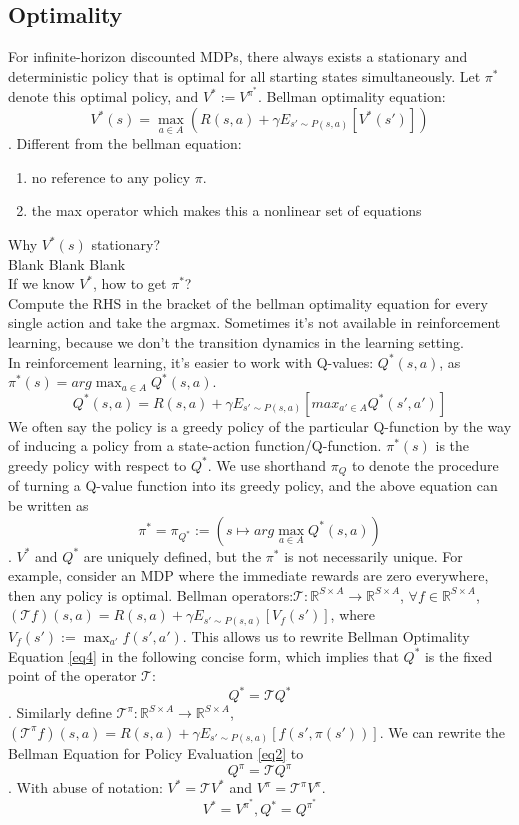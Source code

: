 \documentclass{report}
\begin{document}
\subsection{Optimality}
For infinite-horizon discounted MDPs, there always exists a 
stationary and deterministic policy that is optimal for all starting states simultaneously. Let $\pi^*$ denote this optimal policy, and $V^* := V^{\pi^*}$. Bellman optimality equation: 
\begin{equation}\label{eq3}
    V^*(s)=\max_{a\in A}(R(s,a)+\gamma E_{s'\sim P(s,a)}[V^*(s')])
\end{equation}
. Different from the bellman equation:
\begin{enumerate}
    \item no reference to any policy $\pi$.
    \item the max operator which makes this a nonlinear set of equations
\end{enumerate}
Why $V^*(s)$ stationary? \\
Blank Blank  Blank \\
If we know $V^*$, how to get $\pi^*$? \\
Compute the RHS in the bracket of the bellman optimality equation for every single action and take the argmax. Sometimes it's not available in reinforcement learning, because we don't the transition dynamics in the learning setting.\\
In reinforcement learning, it's easier to work with Q-values: $Q^*(s,a)$, as $\pi^*(s)=arg\max_{a\in A}Q^*(s,a)$. 
\begin{equation}\label{eq4}
    Q^*(s,a)=R(s,a)+\gamma E_{s'\sim P(s,a)}[max_{a'\in A}Q^*(s',a')]
\end{equation}
We often say the policy is a greedy policy of the particular Q-function by the way of inducing a policy from a state-action function/Q-function. $\pi^*(s)$ is the greedy policy with respect to $Q^*$. We use shorthand $\pi_Q$ to denote the procedure of turning a Q-value function into its greedy policy, and the above equation can be written as \[\pi^*=\pi_{Q^*}:=(s \mapsto arg\max_{a\in A}Q^*(s,a))\].
$V^*$ and $Q^*$ are uniquely defined, but the $\pi^*$ is not necessarily unique. For example, consider an MDP where the immediate rewards are zero everywhere, then any policy is optimal. 
Bellman operators:$\mathcal{T}: \mathbb{R}^{S\times A}\rightarrow \mathbb{R}^{S\times A}$, $\forall f \in \mathbb{R}^{S\times A}$, $(\mathcal{T}f)(s,a)=R(s,a)+\gamma E_{s'\sim P(s,a)}[V_f(s')]$, where $V_f(s'):=\max_{a'}f(s',a')$. This allows us to rewrite Bellman Optimality Equation \ref{eq4} in the following concise form, which implies that $Q^*$ is the fixed point of the operator $\mathcal{T}$:\[Q^*=\mathcal{T}Q^*\]. Similarly define $\mathcal{T}^{\pi}: \mathbb{R}^{S\times A}\rightarrow \mathbb{R}^{S\times A}$, $(\mathcal{T}^{\pi}f)(s,a)=R(s,a)+\gamma E_{s'\sim P(s,a)}[f(s',\pi(s'))]$. We can rewrite the Bellman Equation for Policy Evaluation \ref{eq2} to \[Q^{\pi}=\mathcal{T}Q^{\pi}\]. With abuse of notation: $V^{*}=\mathcal{T}V^*$ and $V^{\pi}=\mathcal{T^{\pi}}V^{\pi}$.
\[
V^*=V^{\pi^*},
Q^*=Q^{\pi^*}
\]
\end{document}
